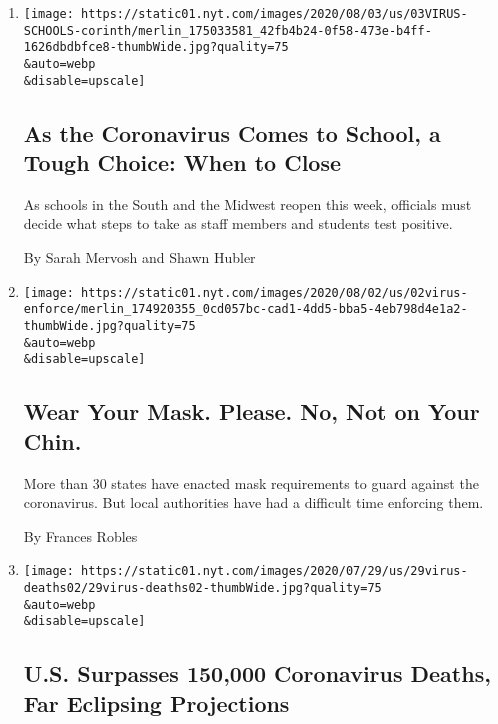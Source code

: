 \begin{enumerate}
\def\labelenumi{\arabic{enumi}.}
\item
  \href{/2020/08/03/us/school-closing-coronavirus.html}{}

  \texttt{[image: https://static01.nyt.com/images/2020/08/03/us/03VIRUS-SCHOOLS-corinth/merlin\_175033581\_42fb4b24-0f58-473e-b4ff-1626dbdbfce8-thumbWide.jpg?quality=75\\\&auto=webp\\\&disable=upscale]}

  \hypertarget{as-the-coronavirus-comes-to-school-a-tough-choice-when-to-close}{%
  \subsection{As the Coronavirus Comes to School, a Tough Choice: When
  to
  Close}\label{as-the-coronavirus-comes-to-school-a-tough-choice-when-to-close}}

  As schools in the South and the Midwest reopen this week, officials
  must decide what steps to take as staff members and students test
  positive.

  By Sarah Mervosh and Shawn Hubler
\item
  \href{/2020/07/31/us/coronavirus-masks-enforcement-key-west.html}{}

  \texttt{[image: https://static01.nyt.com/images/2020/08/02/us/02virus-enforce/merlin\_174920355\_0cd057bc-cad1-4dd5-bba5-4eb798d4e1a2-thumbWide.jpg?quality=75\\\&auto=webp\\\&disable=upscale]}

  \hypertarget{wear-your-mask-please-no-not-on-your-chin}{%
  \subsection{Wear Your Mask. Please. No, Not on Your
  Chin.}\label{wear-your-mask-please-no-not-on-your-chin}}

  More than 30 states have enacted mask requirements to guard against
  the coronavirus. But local authorities have had a difficult time
  enforcing them.

  By Frances Robles
\item
  \href{/2020/07/29/us/coronavirus-deaths-150000.html}{}

  \texttt{[image: https://static01.nyt.com/images/2020/07/29/us/29virus-deaths02/29virus-deaths02-thumbWide.jpg?quality=75\\\&auto=webp\\\&disable=upscale]}

  \hypertarget{us-surpasses-150000-coronavirus-deaths-far-eclipsing-projections}{%
  \subsection{U.S. Surpasses 150,000 Coronavirus Deaths, Far Eclipsing
  Projections}\label{us-surpasses-150000-coronavirus-deaths-far-eclipsing-projections}}


\end{enumerate}
